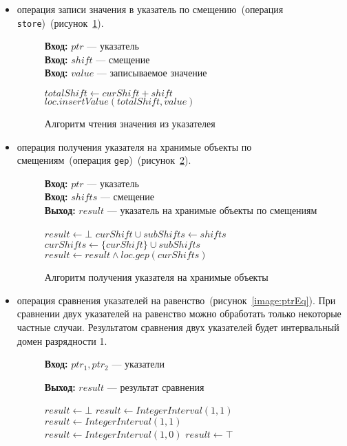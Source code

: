 \begin{itemize}
\item операция записи значения в указатель по смещению~(операция 
\texttt{store})~(рисунок~\ref{image:ptrStore}).
\begin{figure}[h!]
\textbf{Вход:} $ptr$ --- указатель\\
\textbf{Вход:} $shift$ --- смещение\\
\textbf{Вход:} $value$ --- записываемое значение

\begin{algorithmic}[1]
        \State $totalShift \gets curShift + shift$
        \State $loc.insertValue(totalShift, value)$
    \EndFor
\EndFor
\end{algorithmic}
\caption{Алгоритм чтения значения из указателея}
\label{image:ptrStore}
\end{figure}

\item операция получения указателя на хранимые объекты по смещениям~(операция 
\texttt{gep})~(рисунок~\ref{image:ptrGep}).
\begin{figure}[h!]
\textbf{Вход:} $ptr$ --- указатель\\
\textbf{Вход:} $shifts$ --- смещение\\

\textbf{Выход:} $result$ --- указатель на хранимые объекты по смещениям

\begin{algorithmic}[1]
\State $result \gets \bot$
\State $curShift \cup subShifts \gets shifts$
        \State $curShifts \gets \{curShift\} \cup subShifts$
        \State $result \gets result \wedge loc.gep(curShifts)$
    \EndFor
\EndFor
\end{algorithmic}
\caption{Алгоритм получения указателя на хранимые объекты}
\label{image:ptrGep}
\end{figure}

\item операция сравнения указателей на равенство~(рисунок~\ref{image:ptrEq}).
При сравнении двух указателей на равенство можно обработать только некоторые
частные случаи. Результатом сравнения двух указателей будет интервальный домен разрядности 1.
\begin{figure}[h!]
\textbf{Вход:} $ptr_1, ptr_2$ --- указатели

\textbf{Выход:} $result$ --- результат сравнения

\begin{algorithmic}[1]
\State $result \gets \bot$
    \State $result \gets IntegerInterval(1, 1)$
    \State $result \gets IntegerInterval(1, 1)$
    \State $result \gets IntegerInterval(1, 0)$
\Else
    \State $result \gets \top$
\EndIf


\end{algorithmic}
\end{figure}
\end{itemize}
